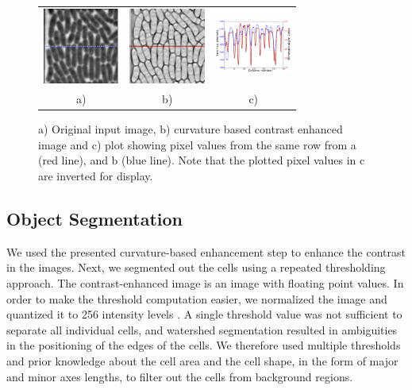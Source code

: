 \documentclass[journal]{IEEEtran}
\begin{document}
\begin{figure}[h]
	\begin{center}
		\begin{tabular}{ccc}
			\includegraphics[width=2.5cm]{orimgmark.png}&\includegraphics[width=2.5cm]{eigenmark.png}&\includegraphics[width=2.5cm]{combineplots.png}
			\\
			a) & b) & c)
		\end{tabular}
		\caption{a) Original input image, b) curvature based contrast enhanced image and c) plot showing pixel values from the same row from a (red line), and b (blue line). Note that the plotted pixel values in c are inverted for display.}\label{fig:contrastenhance}
	\end{center}
\end{figure}


\subsection{Object Segmentation}
We used the presented curvature-based enhancement step to enhance the contrast in the images. Next, we segmented out the cells using a repeated thresholding approach. The contrast-enhanced image is an image with floating point values. In order to make the threshold computation easier, we normalized the image and quantized it to 256 intensity levels . A single threshold value was not sufficient to separate all individual cells, and watershed segmentation resulted in ambiguities in the positioning of the edges of the cells. We therefore used multiple thresholds and prior knowledge about the cell area and the cell shape, in the form of major and minor axes lengths,  to filter out the cells from background regions. 
\end{document}
